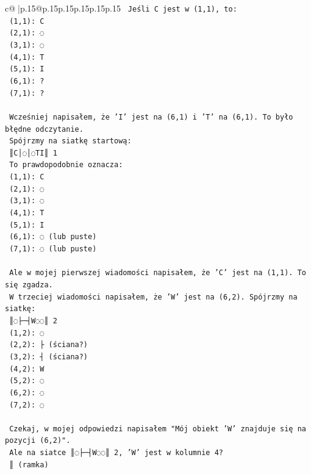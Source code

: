 \documentclass{article}
\begin{document}
{\begin{supertabular}{c@{$\;$}|p{.15\linewidth}@{}p{.15\linewidth}p{.15\linewidth}p{.15\linewidth}p{.15\linewidth}p{.15\linewidth}}
{{{\texttt{   Jeśli C jest w (1,1), to:} \\
\texttt{   (1,1): C} \\
\texttt{   (2,1): ◌} \\
\texttt{   (3,1): ◌} \\
\texttt{   (4,1): T} \\
\texttt{   (5,1): I} \\
\texttt{   (6,1): ?} \\
\texttt{   (7,1): ?} \\
\\ 
\texttt{   Wcześniej napisałem, że 'I' jest na (6,1) i 'T' na (6,1). To było błędne odczytanie.} \\
\texttt{   Spójrzmy na siatkę startową:} \\
\texttt{   ║C│◌│◌TI║ 1} \\
\texttt{   To prawdopodobnie oznacza:} \\
\texttt{   (1,1): C} \\
\texttt{   (2,1): ◌} \\
\texttt{   (3,1): ◌} \\
\texttt{   (4,1): T} \\
\texttt{   (5,1): I} \\
\texttt{   (6,1): ◌ (lub puste)} \\
\texttt{   (7,1): ◌ (lub puste)} \\
\\ 
\texttt{   Ale w mojej pierwszej wiadomości napisałem, że 'C' jest na (1,1). To się zgadza.} \\
\texttt{   W trzeciej wiadomości napisałem, że 'W' jest na (6,2). Spójrzmy na siatkę:} \\
\texttt{   ║◌├─┤W◌◌║ 2} \\
\texttt{   (1,2): ◌} \\
\texttt{   (2,2): ├ (ściana?)} \\
\texttt{   (3,2): ┤ (ściana?)} \\
\texttt{   (4,2): W} \\
\texttt{   (5,2): ◌} \\
\texttt{   (6,2): ◌} \\
\texttt{   (7,2): ◌} \\
\\ 
\texttt{   Czekaj, w mojej odpowiedzi napisałem "Mój obiekt 'W' znajduje się na pozycji (6,2)".} \\
\texttt{   Ale na siatce ║◌├─┤W◌◌║ 2, 'W' jest w kolumnie 4?} \\
\texttt{   ║ (ramka)} \\
}}}
\end{supertabular}}
\end{document}
